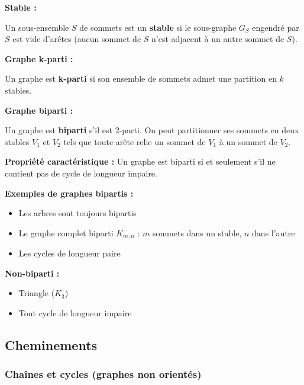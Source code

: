 \documentclass[12pt,a4paper]{article}
\begin{document}
\begin{definition}
\textbf{Stable :}

Un sous-ensemble $S$ de sommets est un \textcolor{titrebleu}{\textbf{stable}} si le sous-graphe $G_S$ engendré par $S$ est vide d'arêtes (aucun sommet de $S$ n'est adjacent à un autre sommet de $S$).

\textbf{Graphe k-parti :}

Un graphe est \textcolor{defvert}{\textbf{k-parti}} si son ensemble de sommets admet une partition en $k$ stables.

\textbf{Graphe biparti :}

Un graphe est \textcolor{algoviolet}{\textbf{biparti}} s'il est 2-parti. On peut partitionner ses sommets en deux stables $V_1$ et $V_2$ tels que toute arête relie un sommet de $V_1$ à un sommet de $V_2$.
\end{definition}

\begin{astuce}
\textbf{Propriété caractéristique :}
Un graphe est biparti si et seulement s'il ne contient pas de cycle de longueur impaire.
\end{astuce}

\begin{exemple}
\textbf{Exemples de graphes bipartis :}
\begin{itemize}
    \item Les arbres sont toujours bipartis
    \item Le graphe complet biparti $K_{m,n}$ : $m$ sommets dans un stable, $n$ dans l'autre
    \item Les cycles de longueur paire
\end{itemize}

\textbf{Non-biparti :}
\begin{itemize}
    \item Triangle ($K_3$)
    \item Tout cycle de longueur impaire
\end{itemize}
\end{exemple}

\newpage
\subsection{Cheminements}

\subsubsection{Chaînes et cycles (graphes non orientés)}
\end{document}
